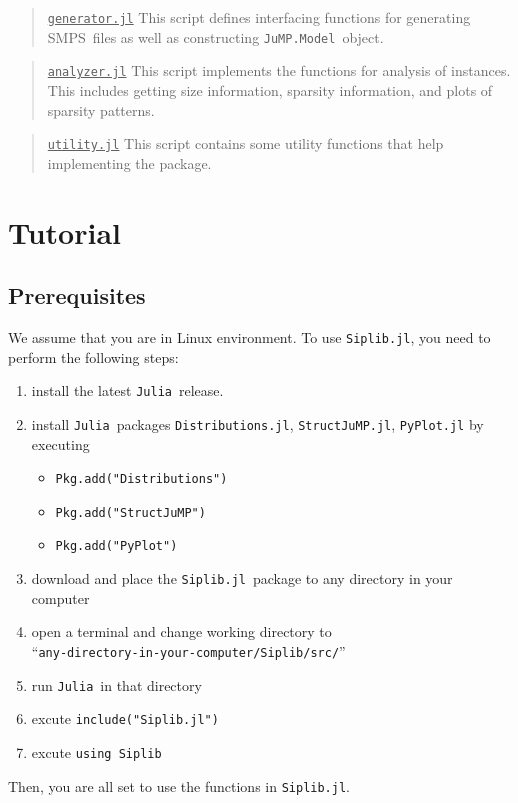 \documentclass{hitec}
\newcommand{\smps}{\textsf{SMPS}}
\newcommand{\julia}{\texttt{Julia}}
\newcommand{\jumpmodel}{\texttt{JuMP.Model}}
\newcommand{\siplibjl}{\texttt{Siplib.jl}}
\begin{document}
	\begin{quotation}
		\noindent\underline{\texttt{generator.jl}} This script defines interfacing functions for generating \smps\ files as well as constructing \jumpmodel\ object.
	\end{quotation}
	
	\begin{quotation}
		\noindent\underline{\texttt{analyzer.jl}} This script implements the functions for analysis of instances. This includes getting size information, sparsity information, and plots of sparsity patterns.
	\end{quotation}
	
	\begin{quotation}
		\noindent\underline{\texttt{utility.jl}} This script contains some utility functions that help implementing the package.
	\end{quotation}

	\pagebreak
	
	\section{Tutorial}
	\subsection{Prerequisites}
	We assume that you are in Linux environment. To use \siplibjl, you need to perform the following steps:
	\begin{enumerate}
		\item install the latest \julia\ release.
		\item install \julia\ packages \texttt{Distributions.jl}, \texttt{StructJuMP.jl}, \texttt{PyPlot.jl} by executing
			\begin{itemize}
				\item \texttt{Pkg.add("Distributions")}
				\item \texttt{Pkg.add("StructJuMP")}
				\item \texttt{Pkg.add("PyPlot")}
			\end{itemize}
		\item download and place the \siplibjl\ package to any directory in your computer
		\item open a terminal and change working directory to\\ ``\texttt{any-directory-in-your-computer/Siplib/src/}''
		\item run \julia\ in that directory
		\item excute \texttt{include("Siplib.jl")}
		\item excute \texttt{using Siplib}
	\end{enumerate}
	Then, you are all set to use the functions in \siplibjl.
	
\end{document}
